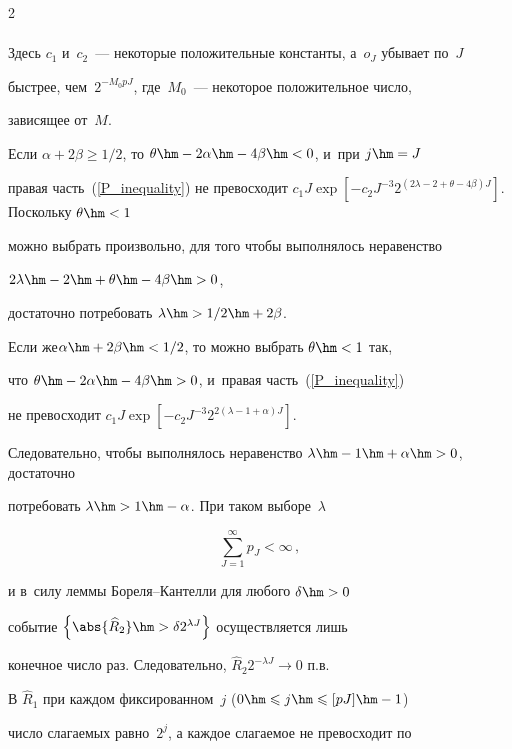 \begin{multicols}{2}
\begin{multline}
\end{multline}

Здесь $c_1$ и~$c_2$~--- некоторые положительные константы, а~$o_J$ убывает по~$J$ 

быстрее, чем~$2^{-M_0 pJ}$, где~$M_0$~--- некоторое положительное число, 

зависящее от~$M$.



Если $\alpha+2\beta\geqslant 1/2$, то $\theta\hm-2\alpha\hm-4\beta\hm<0$, и~при $j\hm=J$ 

правая часть~(\ref{P_inequality}) не превосходит $c_1 J\exp\left[-c_2J^{-3} 

2^{(2\lambda-2+\theta-4\beta)J}\right]$. Поскольку $\theta\hm<1$ 

можно выбрать произвольно, для того чтобы выполнялось неравенство 

$2\lambda\hm-2\hm+\theta\hm-4\beta\hm>0$,

 до\-статочно потребовать $\lambda\hm>1/2\hm+2\beta$. 

Если же\linebreak $\alpha\hm+2\beta\hm<1/2$, то можно выбрать $\theta\hm<1$ так, 

что $\theta\hm-2\alpha\hm-4\beta\hm>0$, и~правая часть~(\ref{P_inequality}) 

не превосходит $c_1 J\exp\left[-c_2J^{-3} 2^{2(\lambda-1+\alpha)J}\right]$. 

Следовательно, чтобы выполнялось неравенство $\lambda\hm-1\hm+\alpha\hm>0$, достаточно 

потребовать $\lambda\hm>1\hm-\alpha$. При таком выборе~$\lambda$

\begin{equation*}

\sum\limits_{J=1}^{\infty}p_J<\infty\,,

\end{equation*}

и в~силу леммы Бо\-ре\-ля--Кан\-тел\-ли для любого $\delta\hm>0$ 

событие $\left\{\abs{\widehat{R}_2}\hm>\delta2^{\lambda J}\right\}$ осуществляется лишь 

конечное число раз. Следовательно, $\widehat{R}_2 2^{-\lambda J}\rightarrow 0$ п.в.



В $\widehat{R}_1$ при каждом фиксированном~$j$ ($0\hm\leqslant j\hm\leqslant [pJ]\hm-1$) 

чис\-ло слагаемых равно~$2^j$, а каждое слагаемое не превосходит по


\end{multicols}
